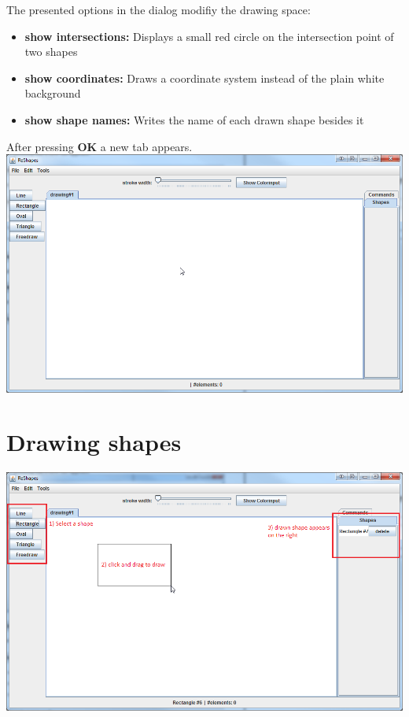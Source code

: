 The presented options in the dialog modifiy the drawing space:
\begin{itemize}
    \item \textbf{show intersections:} 
        Displays a small red circle on the intersection point of two shapes
    \item \textbf{show coordinates:}
        Draws a coordinate system instead of the plain white background
    \item \textbf{show shape names:}
        Writes the name of each drawn shape besides it
\end{itemize}

After pressing \textbf{OK} a new tab appears. \\
\includegraphics[width=1\textwidth]{img/add_new_tab_3} 

\section{Drawing shapes}

\includegraphics[width=1\textwidth]{img/drawing_shape}

